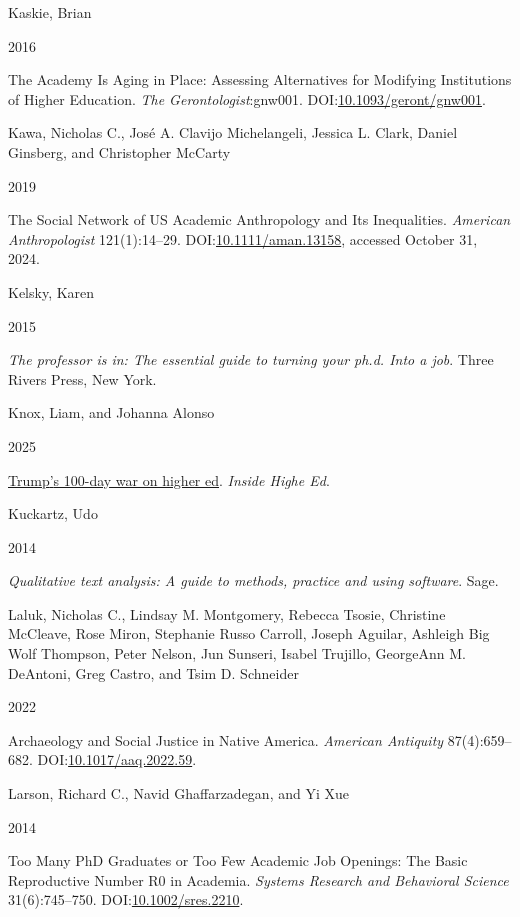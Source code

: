\documentclass[
  12pt,
]{article}
\newlength{\cslhangindent}
\newlength{\csllabelwidth}
\newenvironment{CSLReferences}[2] %
 {\begin{list}{}{%
  \setlength{\itemindent}{0pt}
  \setlength{\leftmargin}{0pt}
  \setlength{\parsep}{0pt}
  \ifodd #1
   \setlength{\leftmargin}{\cslhangindent}
   \setlength{\itemindent}{-1\cslhangindent}
  \fi
  \setlength{\itemsep}{#2\baselineskip}}}
 {\end{list}}
\newcommand{\CSLBlock}[1]{\hfill\break\parbox[t]{\linewidth}{\strut\ignorespaces#1\strut}}
\newcommand{\CSLLeftMargin}[1]{\parbox[t]{\csllabelwidth}{\strut#1\strut}}
\newcommand{\CSLRightInline}[1]{\parbox[t]{\linewidth - \csllabelwidth}{\strut#1\strut}}
\begin{document}
\begin{CSLReferences}{0}{1}
\CSLBlock{Kaskie, Brian}
\CSLLeftMargin{ 2016}%
\CSLRightInline{The Academy Is Aging in Place: Assessing Alternatives
for Modifying Institutions of Higher Education. \emph{The
Gerontologist}:gnw001.
DOI:\href{https://doi.org/10.1093/geront/gnw001}{10.1093/geront/gnw001}.}

\CSLBlock{Kawa, Nicholas C., José A. Clavijo Michelangeli, Jessica L.
Clark, Daniel Ginsberg, and Christopher McCarty}
\CSLLeftMargin{ 2019}%
\CSLRightInline{The {Social Network} of {US Academic Anthropology} and
{Its Inequalities}. \emph{American Anthropologist} 121(1):14--29.
DOI:\href{https://doi.org/10.1111/aman.13158}{10.1111/aman.13158},
accessed October 31, 2024.}

\CSLBlock{Kelsky, Karen}
\CSLLeftMargin{ 2015}%
\CSLRightInline{\emph{The professor is in: The essential guide to
turning your ph.d. Into a job}. Three Rivers Press, New York.}

\CSLBlock{Knox, Liam, and Johanna Alonso}
\CSLLeftMargin{ 2025}%
\CSLRightInline{\href{https://www.insidehighered.com/news/government/politics-elections/2025/04/30/how-trumps-first-100-days-transformed-higher-ed}{Trump{'}s
100-day war on higher ed}. \emph{Inside Highe Ed}.}

\CSLBlock{Kuckartz, Udo}
\CSLLeftMargin{ 2014}%
\CSLRightInline{\emph{Qualitative text analysis: A guide to methods,
practice and using software}. Sage.}

\CSLBlock{Laluk, Nicholas C., Lindsay M. Montgomery, Rebecca Tsosie,
Christine McCleave, Rose Miron, Stephanie Russo Carroll, Joseph Aguilar,
Ashleigh Big Wolf Thompson, Peter Nelson, Jun Sunseri, Isabel Trujillo,
GeorgeAnn M. DeAntoni, Greg Castro, and Tsim D. Schneider}
\CSLLeftMargin{ 2022}%
\CSLRightInline{Archaeology and Social Justice in Native America.
\emph{American Antiquity} 87(4):659--682.
DOI:\href{https://doi.org/10.1017/aaq.2022.59}{10.1017/aaq.2022.59}.}

\CSLBlock{Larson, Richard C., Navid Ghaffarzadegan, and Yi Xue}
\CSLLeftMargin{ 2014}%
\CSLRightInline{Too Many PhD Graduates or Too Few Academic Job Openings:
The Basic Reproductive Number R0 in Academia. \emph{Systems Research and
Behavioral Science} 31(6):745--750.
DOI:\href{https://doi.org/10.1002/sres.2210}{10.1002/sres.2210}.}


\end{CSLReferences}
\end{document}
